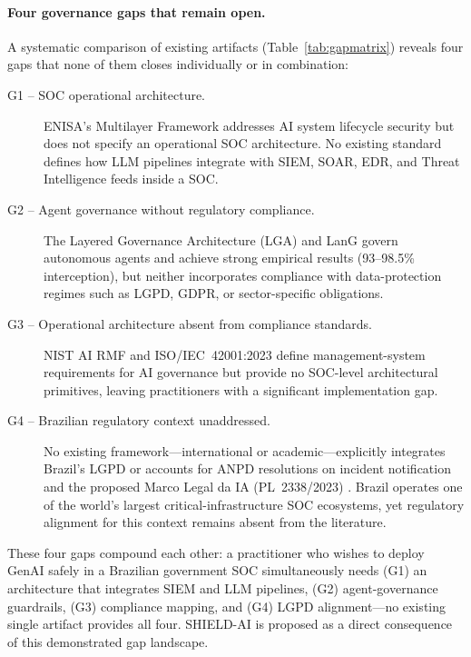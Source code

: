 \documentclass[preprint,12pt,authoryear]{elsarticle}
\begin{document}
\paragraph{Four governance gaps that remain open.}
A systematic comparison of existing artifacts (Table~\ref{tab:gapmatrix}) reveals four gaps
that none of them closes individually or in combination:
\begin{description}
  \item[G1 -- SOC operational architecture.]
    ENISA's Multilayer Framework \citep{enisa2023multilayer} addresses AI system lifecycle
    security but does not specify an operational SOC architecture.
    No existing standard defines how LLM pipelines integrate with SIEM, SOAR, EDR,
    and Threat Intelligence feeds inside a SOC.
  \item[G2 -- Agent governance without regulatory compliance.]
    The Layered Governance Architecture (LGA) \citep{lga2026} and LanG \citep{lang2026}
    govern autonomous agents and achieve strong empirical results (93--98.5\% interception),
    but neither incorporates compliance with data-protection regimes such as LGPD, GDPR,
    or sector-specific obligations.
  \item[G3 -- Operational architecture absent from compliance standards.]
    NIST AI RMF \citep{nist2023airmf} and ISO/IEC~42001:2023 \citep{iso42001} define
    management-system requirements for AI governance but provide no SOC-level architectural
    primitives, leaving practitioners with a significant implementation gap.
  \item[G4 -- Brazilian regulatory context unaddressed.]
    No existing framework---international or academic---explicitly integrates
    Brazil's LGPD \citep{lgpd2018} or accounts for ANPD resolutions on incident
    notification \citep{anpd15} and the proposed Marco Legal da IA (PL~2338/2023) \citep{pl2338}.
    Brazil operates one of the world's largest critical-infrastructure SOC ecosystems,
    yet regulatory alignment for this context remains absent from the literature.
\end{description}
These four gaps compound each other: a practitioner who wishes to deploy GenAI safely in a
Brazilian government SOC simultaneously needs (G1) an architecture that integrates SIEM and
LLM pipelines, (G2) agent-governance guardrails, (G3) compliance mapping, and (G4) LGPD
alignment---no existing single artifact provides all four.
SHIELD-AI is proposed as a direct consequence of this demonstrated gap landscape.
\end{document}
